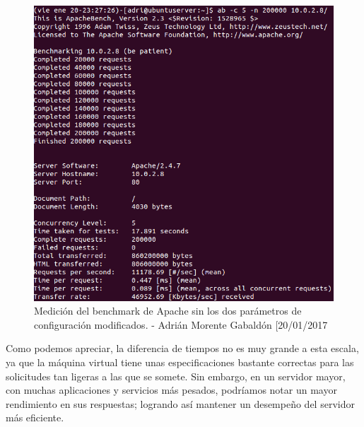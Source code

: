 \begin{figure}[H]
	\centering
	\includegraphics[scale=0.5]{ab-segundo}
	\caption{Medición del benchmark de Apache sin los dos parámetros de configuración modificados. - Adrián Morente Gabaldón [20/01/2017}
	\label{figura21}
\end{figure}

Como podemos apreciar, la diferencia de tiempos no es muy grande a esta escala, ya que la máquina virtual tiene unas especificaciones bastante correctas para las solicitudes tan ligeras a las que se somete. Sin embargo, en un servidor mayor, con muchas aplicaciones y servicios más pesados, podríamos notar un mayor rendimiento en sus respuestas; logrando así mantener un desempeño del servidor más eficiente.





